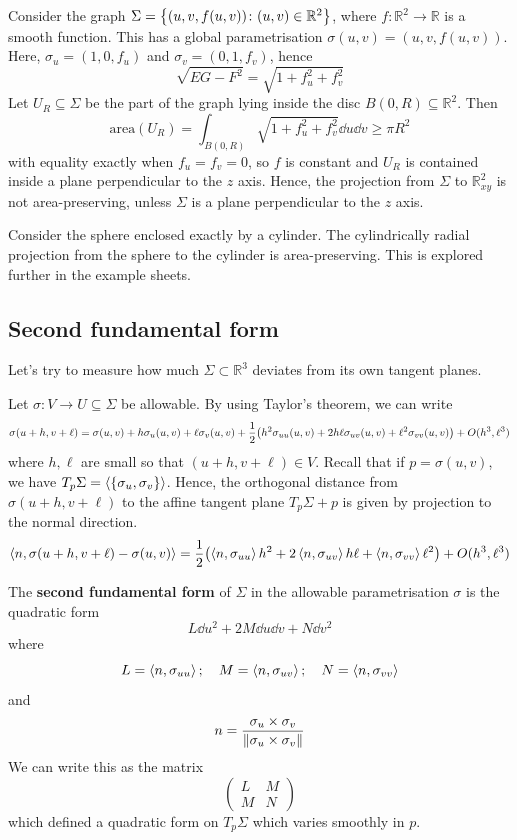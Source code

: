 \documentclass[a4paper,11pt]{article}
\begin{document}
\begin{example}
	Consider the graph \( \Sigma = \qty{(u,v,f(u,v)) \colon (u,v) \in \mathbb R^2} \), where \( f \colon \mathbb R^2 \to \mathbb R \) is a smooth function.
	This has a global parametrisation \( \sigma(u,v) = (u,v,f(u,v)) \).
	Here, \( \sigma_u = (1,0,f_u) \) and \( \sigma_v = (0,1,f_v) \), hence
	\[
		\sqrt{EG - F^2} = \sqrt{1+f_u^2+f_v^2}
	\]
	Let \( U_R \subseteq \Sigma \) be the part of the graph lying inside the disc \( B(0,R) \subseteq \mathbb R^2 \).
	Then
	\[
		\mathrm{area}(U_R) = \int_{B(0,R)} \sqrt{1+f_u^2+f_v^2} \dd{u}\dd{v} \geq \pi R^2
	\]
	with equality exactly when \( f_u = f_v = 0 \), so \( f \) is constant and \( U_R \) is contained inside a plane perpendicular to the \( z \) axis.
	Hence, the projection from \( \Sigma \) to \( \mathbb R^2_{xy} \) is not area-preserving, unless \( \Sigma \) is a plane perpendicular to the \( z \) axis.
\end{example}
\begin{example}
	Consider the sphere enclosed exactly by a cylinder.
	The cylindrically radial projection from the sphere to the cylinder is area-preserving.
	This is explored further in the example sheets.
\end{example}

\subsection{Second fundamental form}
Let's try to measure how much $ \Sigma \subset \mathbb{R}^{3} $ deviates from its own tangent planes. 

Let \( \sigma \colon V \to U \subseteq \Sigma \) be allowable.
By using Taylor's theorem, we can write
\[
	\sigma(u+h,v+\ell) = \sigma(u,v) + h \sigma_u(u,v) + \ell \sigma_v(u,v) + \frac{1}{2} \qty(h^2 \sigma_{uu}(u,v) + 2h\ell \sigma_{uv}(u,v) + \ell^2 \sigma_{vv}(u,v)) + O(h^3,\ell^3)
\]
where \( h,\ell \) are small so that \( (u+h,v+\ell) \in V \).
Recall that if \( p = \sigma(u,v) \), we have \( T_p \Sigma = \left\langle{} \qty{\sigma_u,\sigma_v} \right\rangle \).
Hence, the orthogonal distance from \( \sigma(u+h,v+\ell) \) to the affine tangent plane \( T_p \Sigma + p \) is given by projection to the normal direction.
\[
	\left\langle{n,\sigma(u+h,v+\ell) - \sigma(u,v)}\right\rangle = \frac{1}{2} \qty(\left\langle{n,\sigma_{uu}}\right\rangle h^2 + 2\left\langle{n,\sigma_{uv}}\right\rangle h\ell + \left\langle{n,\sigma_{vv}}\right\rangle\ell^2) + O(h^3,\ell^3)
\]

\begin{definition}
	The \textbf{second fundamental form} of \( \Sigma \) in the allowable parametrisation \( \sigma \) is the quadratic form
	\[
		L \dd{u}^2 + 2 M \dd{u} \dd{v} + N \dd{v}^2
	\]
	where
	\[
		L = \left\langle{n,\sigma_{uu}}\right\rangle;\quad M = \left\langle{n,\sigma_{uv}}\right\rangle;\quad N = \left\langle{n,\sigma_{vv}}\right\rangle
	\]
	and
	\[
		n = \frac{\sigma_u \times \sigma_v}{\norm{\sigma_u \times \sigma_v}}
	\]
	We can write this as the matrix
	\[
		\begin{pmatrix}
			L & M \\
			M & N
		\end{pmatrix}
	\]
	which defined a quadratic form on \( T_p \Sigma \) which varies smoothly in \( p \).
\end{definition}
\end{document}
